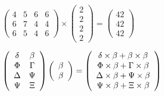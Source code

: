 \documentclass[12pt]{article}
\begin{document}
 
 
\noindent{}
 
 

 
$\left( \begin{array}{ccccccccccccccc}
           4  & 
           5  & 
           6  & 
           6  \\ 
           6  & 
           7  & 
           4  & 
           4  \\ 
           6  & 
           5  & 
           4  & 
           6
\end{array}\right) \times
\left( \begin{array}{c}
           2  \\ 
           2  \\ 
           2  \\ 
           2
\end{array}\right)  =
\left( \begin{array}{c}
          42  \\ 
          42  \\ 
          42
\end{array}\right)  $
 
$  %
 \left( \begin{array}
 {
 c
 c
 }
 \delta & 
 \beta \\ 
 \Phi & 
 \Gamma \\ 
 \Delta & 
 \Psi \\ 
 \Psi & 
                    \Xi
 \end{array} \right)
 \left( \begin{array}
 {
 c
 }
 \beta \\ 
 \beta
 \end{array} \right)
=
 \left( \begin{array}
 {
 c
 }
  \delta \times  \beta +  \beta \times  \beta \\ 
  \Phi \times  \beta +  \Gamma \times  \beta \\ 
  \Delta \times  \beta +  \Psi \times  \beta \\ 
  \Psi \times  \beta +                     \Xi \times  \beta
 \end{array} \right)
$
 
 
 
\noindent{}
 
 

 
 
 
\noindent{}
 
\end{document}
